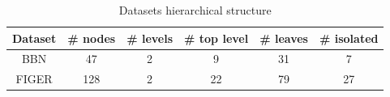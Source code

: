 \begin{table}
\centering
\caption{Datasets hierarchical structure}
\label{tab:dataset_hierarchy}
\begin{tabular}{|c|ccccc|}
\hline
\textbf{Dataset} & \multicolumn{1}{c|}{\textbf{\# nodes}} & \multicolumn{1}{c|}{\textbf{\# levels}} & \multicolumn{1}{c|}{\textbf{\# top level}} & \multicolumn{1}{c|}{\textbf{\# leaves}} & \textbf{\# isolated} \\ \hline
BBN              & 47                                     & 2                                       & 9                                          & 31                                      & 7                    \\ \hline
FIGER            & 128                                    & 2                                       & 22                                         & 79                                      & 27                   \\ \hline
\end{tabular}
\end{table}